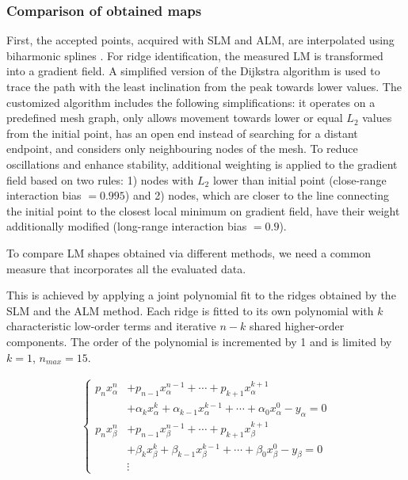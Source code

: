 \documentclass[journal,twoside,web]{ieeecolor2}
\begin{document}
\subsubsection{Comparison of obtained maps}
First, the accepted points, acquired with SLM and ALM, are interpolated using biharmonic splines \cite{DZ2011}.
For ridge identification, the measured LM is transformed into a gradient field.
A simplified version of the Dijkstra algorithm \cite{Di1959} is used to trace the path with the least inclination from the peak towards lower values.
The customized algorithm includes the following simplifications: it operates on a predefined mesh graph, only allows movement towards lower or equal $L_2$ values from the initial point, has an open end instead of searching for a distant endpoint, and considers only neighbouring nodes of the mesh.
To reduce oscillations and enhance stability, additional weighting is applied to the gradient field based on two rules: 1) nodes with $L_2$ lower than initial point (close-range interaction bias $= 0.995$) and 2) nodes, which are closer to the line connecting the initial point to the closest local minimum on gradient field, have their weight additionally modified (long-range interaction bias $= 0.9$).


To compare LM shapes obtained via different methods, we need a common measure that incorporates all the evaluated data.


This is achieved by applying a joint polynomial fit to the ridges obtained by the SLM and the ALM method.
Each ridge is fitted to its own polynomial with $k$ characteristic low-order terms and iterative $n-k$ shared higher-order components.
The order of the polynomial is incremented by 1 and is limited by $k = 1$, $n_{max} = 15$.


\begin{align}
\begin{cases}
p_{n} x_{\alpha}^n&+p_{n-1} x_{\alpha}^{n-1}+\cdots+p_{k+1} x_{\alpha}^{k+1} \\
&+\alpha_k x_{\alpha}^{k}+\alpha_{k-1} x_{\alpha}^{k-1}+\cdots+\alpha _0 x_{\alpha}^0-y_{\alpha} =0 \\
p_{n} x_{\beta}^n&+p_{n-1} x_{\beta}^{n-1}+\cdots+p_{k+1} x_{\beta}^{k+1} \\
&+\beta_k x_{\beta}^{k}+\beta_{k-1} x_{\beta}^{k-1}+\cdots+\beta _0 x_{\beta}^0-y_{\beta} =0 \\
& \vdots 
\end{cases}
\label{eq1}
\end{align}
\end{document}
